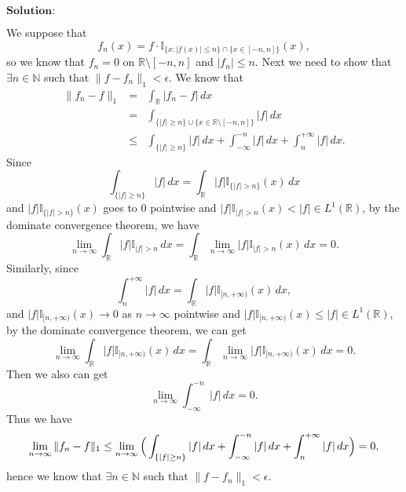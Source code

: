 \documentclass[12pt,a4paper]{ctexart}
\begin{document}
\vspace{8pt}
$\textbf{Solution:}$

We suppose that
\begin{equation*}
    f_{n} (x) = f \cdot \mathbb{I}_{\{x: |f(x)| \leq n\} \cap \{x \in [-n, n]\}} (x),
\end{equation*}
so we know that $f_{n} = 0$ on $\mathbb{R} \setminus [-n, n]$ and $|f_{n}| \leq n$. Next we need to show that $\exists n \in \mathbb{N}$ such that $\|f - f_{n}\|_{1} < \epsilon$. We know that
\begin{eqnarray*}
    \|f_{n} - f\|_{1} &=& \int_{\mathbb{R}}^{} |f_{n} - f| \, d x \\
    &=& \int_{\{|f| \geq n\} \cup \{x \in \mathbb{R} \setminus [-n, n]\}}^{} |f| \, d x  \\
    & \leq &  \int_{\{|f| \geq n\}}^{} |f| \, d x + \int_{-\infty}^{-n} |f| \, d x + \int_{n}^{+\infty} |f| \, d x .
\end{eqnarray*}
Since 
\begin{equation*}
    \int_{\{|f| \geq n\}}^{} |f| \, d x = \int_{\mathbb{R}}^{} |f| \mathbb{I}_{\{|f|>n\}} (x) \, d x
\end{equation*}
and $|f| \mathbb{I}_{\{|f|>n\}} (x)$ goes to $0$ pointwise and $|f| \mathbb{I}_{|f|>n} (x) < |f| \in L^{1}(\mathbb{R})$, by the dominate convergence theorem, we have
\begin{equation*}
    \lim_{n \to \infty} \int_{\mathbb{R}}^{} |f| \mathbb{I}_{|f|>n} \, d x = \int_{\mathbb{R}}^{}  \lim_{n \to \infty} |f| \mathbb{I}_{|f|>n} (x) \, d x = 0.
\end{equation*}
Similarly, since 
\begin{equation*}
    \int_{n}^{+ \infty} |f| \, d x = \int_{\mathbb{R}}^{} |f| \mathbb{I}_{[n, +\infty)} (x) \, d x,
\end{equation*}
and $|f| \mathbb{I}_{[n, +\infty)} (x) \to 0$ as $n \to \infty$ pointwise and $|f| \mathbb{I}_{[n, +\infty)} (x) \leq |f| \in L^{1}(\mathbb{R})$, by the dominate convergence theorem, we can get
\begin{equation*}
  \lim_{n \to \infty} \int_{\mathbb{R}}^{} |f| \mathbb{I}_{[n, +\infty)} (x) \, d x = \int_{\mathbb{R}}^{}  \lim_{n \to \infty} |f| \mathbb{I}_{[n, +\infty)} (x) \, d x = 0.
\end{equation*}
Then we also can get
\begin{equation*}
    \lim_{n \to \infty} \int_{-\infty}^{-n} |f| \, d x = 0.
\end{equation*}
Thus we have
\begin{equation*}
    \lim_{n \to \infty} \|f_{n} - f\|_{1} \leq \lim_{n \to \infty} \Big{(} \int_{\{|f| \geq n\}}^{} |f| \, d x + \int_{-\infty}^{-n} |f| \, d x + \int_{n}^{+\infty} |f| \, d x \Big{)} = 0,
\end{equation*}
hence we know that $\exists n \in \mathbb{N}$ such that $\|f - f_{n}\|_{1} < \epsilon$.
\end{document}
